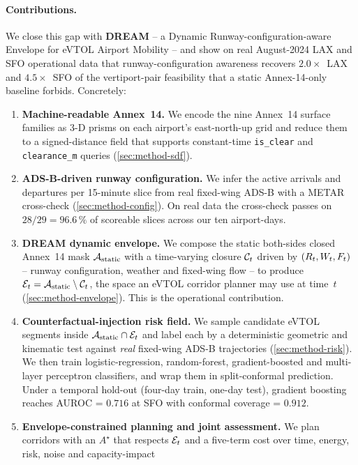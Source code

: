 \paragraph{Contributions.}
We close this gap with \textbf{DREAM} -- a Dynamic Runway-configuration-aware
Envelope for eVTOL Airport Mobility -- and show on real
August-2024 LAX and SFO operational data that runway-configuration awareness
recovers $2.0\times$~LAX and $4.5\times$~SFO of the vertiport-pair feasibility
that a static Annex-14-only baseline forbids. Concretely:
\begin{enumerate}
    \item \textbf{Machine-readable Annex~14.} We encode the nine Annex~14
    surface families as 3-D prisms on each airport's east-north-up grid and
    reduce them to a signed-distance field that supports
    constant-time \texttt{is\_clear} and \texttt{clearance\_m} queries
    (\cref{sec:method-sdf}).
    \item \textbf{ADS-B-driven runway configuration.} We infer the active
    arrivals and departures per 15-minute slice from real fixed-wing ADS-B
    with a METAR cross-check (\cref{sec:method-config}). On real data the
    cross-check passes on $28/29 = 96.6\,\%$ of scoreable slices across our
    ten airport-days.
    \item \textbf{DREAM dynamic envelope.} We compose the static both-sides
    closed Annex~14 mask $\mathcal{A}_{\mathrm{static}}$ with a time-varying closure $\mathcal{C}_t$
    driven by $(R_t,W_t,F_t)$ -- runway configuration, weather and
    fixed-wing flow -- to produce $\mathcal{E}_t = \mathcal{A}_{\mathrm{static}} \setminus \mathcal{C}_t$, the
    space an eVTOL corridor planner may use at time~$t$
    (\cref{sec:method-envelope}). This is the operational contribution.
    \item \textbf{Counterfactual-injection risk field.} We sample candidate
    eVTOL segments inside $\mathcal{A}_{\mathrm{static}} \cap \mathcal{E}_t$ and label each by a
    deterministic geometric and kinematic test against \emph{real}
    fixed-wing ADS-B trajectories (\cref{sec:method-risk}). We then train
    logistic-regression, random-forest, gradient-boosted and multi-layer
    perceptron classifiers, and wrap them in split-conformal prediction.
    Under a temporal hold-out (four-day train, one-day test), gradient
    boosting reaches AUROC = $0.716$ at SFO with conformal coverage = $0.912$.
    \item \textbf{Envelope-constrained planning and joint assessment.} We
    plan corridors with an $A^\star$ that respects $\mathcal{E}_t$ and a five-term
    cost over time, energy, risk, noise and capacity-impact

\end{enumerate}
